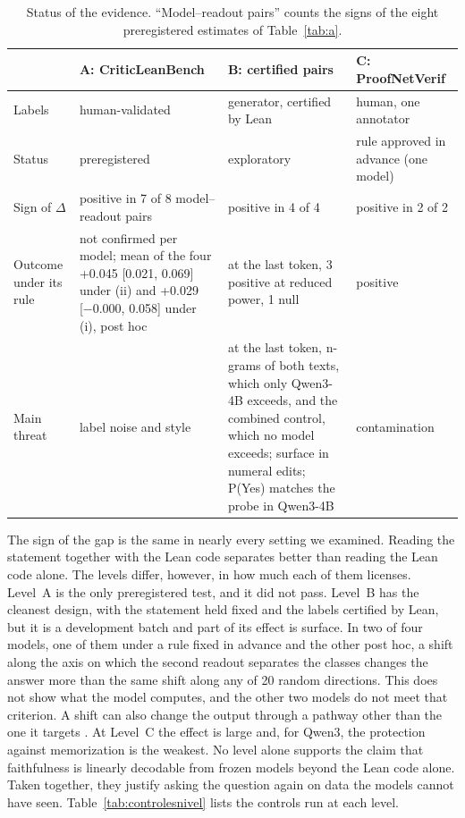 \documentclass[10pt]{article}
\newcommand{\D}{\Delta}
\begin{document}
\begin{table}[h]
\centering
\caption{Status of the evidence. ``Model--readout pairs'' counts the signs of the eight preregistered estimates of Table~\ref{tab:a}.}
\label{tab:conjunta}
\vspace{2pt}
\begin{tabularx}{\linewidth}{@{}lXXX@{}}
\toprule
 & A: CriticLeanBench & B: certified pairs & C: ProofNetVerif\\
\midrule
Labels & human-validated & generator, certified by Lean & human, one annotator\\
Status & preregistered & exploratory & rule approved in advance (one model)\\
Sign of $\D$ & positive in 7 of 8 model--readout pairs & positive in 4 of 4 & positive in 2 of 2\\
Outcome under its rule & not confirmed per model; mean of the four +0.045 [0.021, 0.069] under (ii) and +0.029 [−0.000, 0.058] under (i), post hoc & at the last token, 3 positive at reduced power, 1 null & positive\\
Main threat & label noise and style & at the last token, n-grams of both texts, which only Qwen3-4B exceeds, and the combined control, which no model exceeds; surface in numeral edits; P(Yes) matches the probe in Qwen3-4B & contamination\\
\bottomrule
\end{tabularx}
\end{table}

The sign of the gap is the same in nearly every setting we examined. Reading the statement together with the Lean code
separates better than reading the Lean code alone. The levels differ, however, in how much each of them licenses.
Level~A is the only preregistered test, and it did not pass. Level~B has the cleanest design, with the statement
held fixed and the labels certified by Lean, but it is a development batch and part of its effect is surface.
In two of four models, one of them under a rule fixed in advance and the other post hoc, a shift along the axis on which the second readout
separates the classes changes the answer more than the same shift along any of 20 random directions. This does not show what the model computes, and the other two models do not meet that criterion. A shift can also change the output through a pathway other than
the one it targets \citep{makelov2024subspace}. At
Level~C the effect is large and, for Qwen3, the protection against memorization is the weakest. No level alone
supports the claim that faithfulness is linearly decodable from frozen models beyond the Lean code alone.
Taken together, they justify asking the question again on data the models cannot have seen.
Table~\ref{tab:controlesnivel} lists the controls run at each level.
\end{document}

